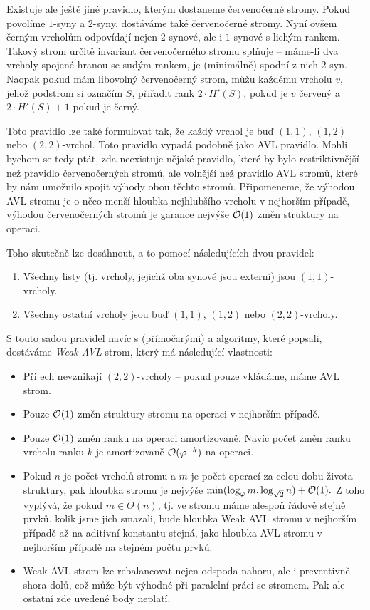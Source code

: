 Existuje ale ještě jiné pravidlo, kterým dostaneme červenočerné stromy. Pokud povolíme $1$-syny a $2$-syny, dostáváme také červenočerné stromy. Nyní ovšem černým vrcholům odpovídají nejen $2$-synové, ale i $1$-synové s lichým rankem. Takový strom určitě invariant červenočerného stromu splňuje -- máme-li dva vrcholy spojené hranou se sudým rankem, je (minimálně) spodní z nich 2-syn. Naopak pokud mám libovolný červenočerný strom, můžu každému vrcholu $v$, jehož podstrom si označím $S$, přiřadit rank $2\cdot H'(S)$, pokud je $v$ červený a $2\cdot H'(S) + 1$ pokud je černý.

Toto pravidlo lze také formulovat tak, že každý vrchol je buď $(1,1)$, $(1,2)$ nebo $(2,2)$-vrchol. Toto pravidlo vypadá podobně jako AVL pravidlo. Mohli bychom se tedy ptát, zda neexistuje nějaké pravidlo, které by bylo restriktivnější než pravidlo červenočerných stromů, ale volnější než pravidlo AVL stromů, které by nám umožnilo spojit výhody obou těchto stromů. Připomeneme, že výhodou AVL stromu je o něco menší hloubka nejhlubšího vrcholu v nejhorším případě, výhodou červenočerných stromů je garance nejvýše $\mathcal O(1)$ změn struktury na operaci. 

Toho skutečně lze dosáhnout, a to pomocí následujících dvou pravidel:
\begin{enumerate}
\item Všechny listy (tj. vrcholy, jejichž oba synové jsou externí) jsou $(1,1)$-vrcholy.
\item Všechny ostatní vrcholy jsou buď $(1,1)$, $(1,2)$ nebo $(2,2)$-vrcholy.
\end{enumerate}

S touto sadou pravidel navíc s (přímočarými)  a  algoritmy, které \citet{rankbalanced} popsali, dostáváme \emph{Weak AVL} strom, který má následující vlastnosti:

\begin{itemize}
\item Při ech nevznikají $(2,2)$-vrcholy -- pokud pouze vkládáme, máme AVL strom.
\item Pouze $\mathcal O(1)$ změn struktury stromu na operaci v nejhorším případě.
\item Pouze $\mathcal O(1)$ změn ranku na operaci amortizovaně. Navíc počet změn ranku vrcholu ranku $k$ je amortizovaně $\mathcal O(\varphi^{-k})$ na operaci.
\item Pokud $n$ je počet vrcholů stromu a $m$ je počet operací  za celou dobu života struktury, pak hloubka stromu je nejvýše $\min(\log_{\varphi} m, \log_{\sqrt2} n) + \mathcal O(1).$ Z toho vyplývá, že pokud $m\in\Theta(n)$, tj. ve stromu máme alespoň řádově stejně prvků. kolik jsme jich smazali, bude hloubka Weak AVL stromu v nejhorším případě až na aditivní konstantu stejná, jako hloubka AVL stromu v nejhorším případě na stejném počtu prvků.
\item Weak AVL strom lze rebalancovat nejen odspoda nahoru, ale i preventivně shora dolů, což může být výhodné při paralelní práci se stromem. Pak ale ostatní zde uvedené body neplatí.
\end{itemize}



